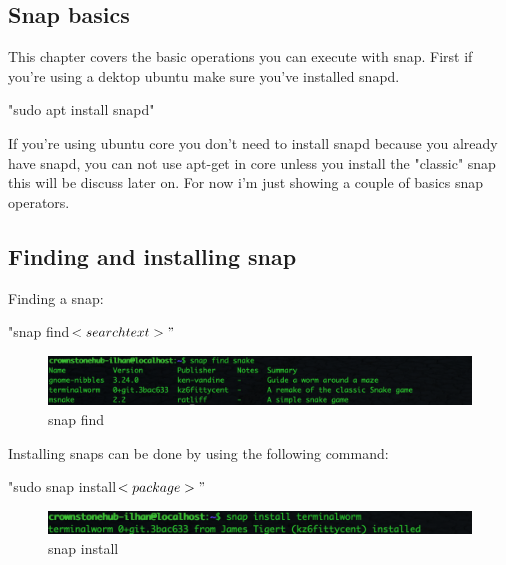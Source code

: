\documentclass{article}
\begin{document}
\begin{flushleft}
\section{Snap basics}\label{sec:snapbasics}
This chapter covers the basic operations you can execute with snap. 
First if you're  using a dektop ubuntu make sure you've installed snapd. \\

			\begin{center}	
			"sudo apt install snapd"
			\end{center}
If you're using ubuntu core you don't need to install snapd because you already have snapd, you can not use apt-get in core unless you install the "classic" snap this will be discuss later on. For now i'm just showing a couple of basics snap operators. \\
\bigskip
\subsection{Finding and installing snap}\label{sec:findAndInstall}
Finding a snap: 
			\begin{center}				
			"snap find$  <searchtext>"$			
			\end{center}
\label{fig:snapFind}	
	\begin{figure}[H]
	\includegraphics[width=5in]{snapFind.png}
	\caption[Optional caption]{snap find}
	\end{figure}

Installing snaps can be done by using the following command:\\
			\begin{center}				
			"sudo snap install$  <package>"$			
			\end{center}
\label{fig:snapInstall}	
	\begin{figure}[H]
	\includegraphics[width=5in]{snapInstall.png}
	\caption[Optional caption]{snap install}
	\end{figure}
\cleardoublepage

\end{flushleft}
\end{document}
